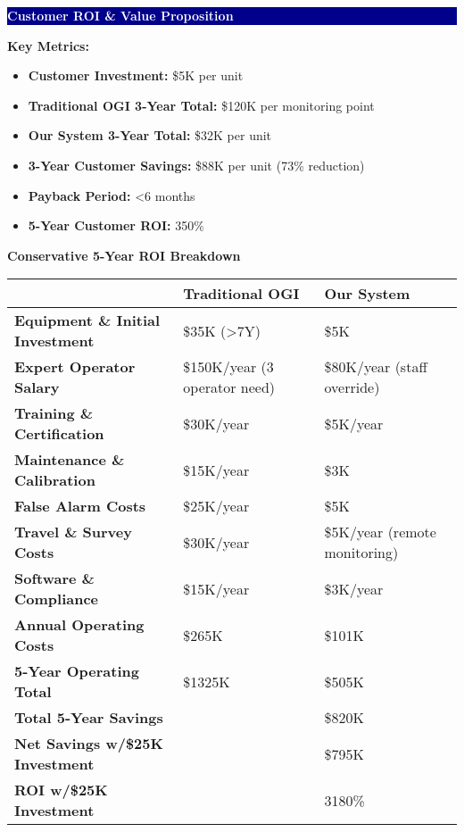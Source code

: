\documentclass[11pt,a4paper]{article}
\begin{document}
\begin{minipage}{0.48\textwidth}
\colorbox{darkblue}{\parbox{\linewidth}{\centering\textcolor{white}{\textbf{Customer ROI \& Value Proposition}}}}

\textbf{Key Metrics:}
\begin{itemize}[leftmargin=*,itemsep=0pt]
\item \textbf{Customer Investment:} \$5K per unit
\item \textbf{Traditional OGI 3-Year Total:} \$120K per monitoring point
\item \textbf{Our System 3-Year Total:} \$32K per unit
\item \textbf{3-Year Customer Savings:} \$88K per unit (73\% reduction)
\item \textbf{Payback Period:} <6 months
\item \textbf{5-Year Customer ROI:} 350\%
\end{itemize}

\textbf{Conservative 5-Year ROI Breakdown}

\begin{tabular}{|l|l|l|}
\hline
& \textbf{Traditional OGI} & \textbf{Our System} \\
\hline
\textbf{Equipment \& Initial Investment} & \$35K (>7Y) & \$5K \\
\hline
\textbf{Expert Operator Salary} & \$150K/year (3 operator need) & \$80K/year (staff override) \\
\hline
\textbf{Training \& Certification} & \$30K/year & \$5K/year \\
\hline
\textbf{Maintenance \& Calibration} & \$15K/year & \$3K \\
\hline
\textbf{False Alarm Costs} & \$25K/year & \$5K \\
\hline
\textbf{Travel \& Survey Costs} & \$30K/year & \$5K/year (remote monitoring) \\
\hline
\textbf{Software \& Compliance} & \$15K/year & \$3K/year \\
\hline
\textbf{Annual Operating Costs} & \$265K & \$101K \\
\hline
\textbf{5-Year Operating Total} & \$1325K & \$505K \\
\hline
\textbf{Total 5-Year Savings} & & \$820K \\
\hline
\textbf{Net Savings w/\$25K Investment} & & \$795K \\
\hline
\textbf{ROI w/\$25K Investment} & & 3180\% \\
\hline
\end{tabular}
\end{minipage}
\end{document}
